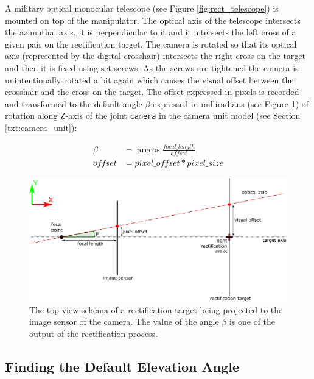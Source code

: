 A military optical monocular telescope (see Figure \ref{fig:rect_telescope}) is mounted on top of the manipulator. The optical axis of the telescope intersects the azimuthal axis, it is perpendicular to it and it intersects the left cross of a given pair on the rectification target. The camera is rotated so that its optical axis (represented by the digital crosshair) intersects the right cross on the target and then it is fixed using set screws. As the screws are tightened the camera is unintentionally rotated a bit again which causes the visual offset between the crosshair and the cross on the target. The offset expressed in pixels is recorded and transformed to the default angle $\beta$ expressed in milliradians (see Figure \ref{fig:rect_pixel_offset}) of rotation along Z-axis of the joint \texttt{camera} in the camera unit model (see Section \ref{txt:camera_unit}):

\begin{equation*}
\begin{aligned}
\beta &= \arccos\frac{focal\_length}{offset}, \\
offset &= pixel\_offset * pixel\_size
\end{aligned}
\end{equation*}

\begin{figure}[htb]
	\centering
	\includegraphics[width=13cm]{fig/rect_pixel_offset.pdf}
	\caption{The top view schema of a rectification target being projected to the image sensor of the camera. The value of the angle $\beta$ is one of the output of the rectification process.}
	\label{fig:rect_pixel_offset}
\end{figure}


\subsection{Finding the Default Elevation Angle}

